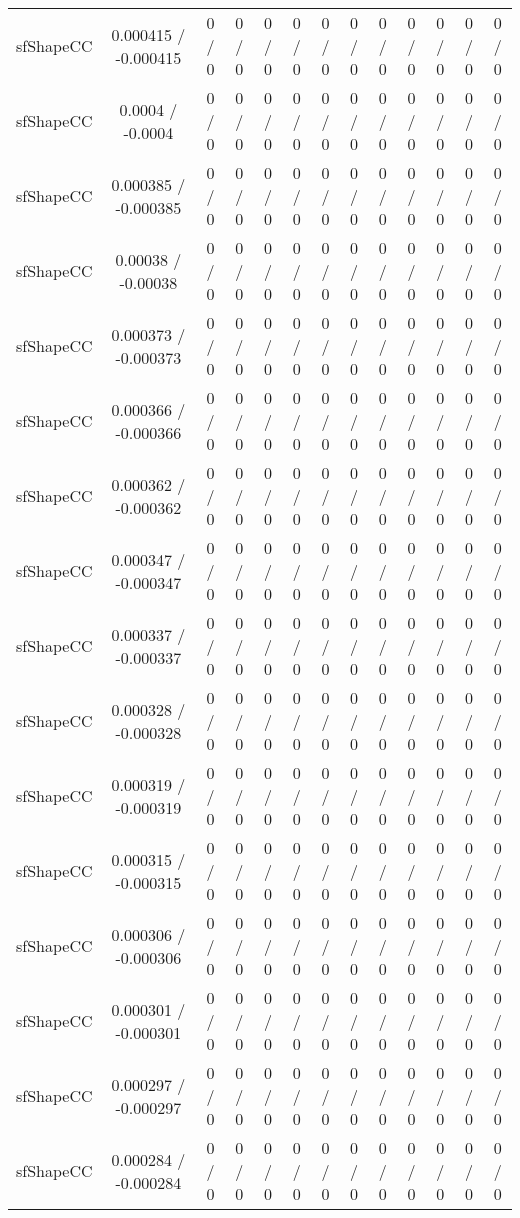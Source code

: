 \documentclass[10pt]{article}
\begin{document}
\begin{table}[htbp]
\begin{center}
\begin{tabular}{|c|c|c|c|c|c|c|c|c|c|c|c|c|}
  sfShapeCC & 0.000415 / -0.000415 & 0 / 0 & 0 / 0 & 0 / 0 & 0 / 0 & 0 / 0 & 0 / 0 & 0 / 0 & 0 / 0 & 0 / 0 & 0 / 0 & 0 / 0 \\ 
  sfShapeCC & 0.0004 / -0.0004 & 0 / 0 & 0 / 0 & 0 / 0 & 0 / 0 & 0 / 0 & 0 / 0 & 0 / 0 & 0 / 0 & 0 / 0 & 0 / 0 & 0 / 0 \\ 
  sfShapeCC & 0.000385 / -0.000385 & 0 / 0 & 0 / 0 & 0 / 0 & 0 / 0 & 0 / 0 & 0 / 0 & 0 / 0 & 0 / 0 & 0 / 0 & 0 / 0 & 0 / 0 \\ 
  sfShapeCC & 0.00038 / -0.00038 & 0 / 0 & 0 / 0 & 0 / 0 & 0 / 0 & 0 / 0 & 0 / 0 & 0 / 0 & 0 / 0 & 0 / 0 & 0 / 0 & 0 / 0 \\ 
  sfShapeCC & 0.000373 / -0.000373 & 0 / 0 & 0 / 0 & 0 / 0 & 0 / 0 & 0 / 0 & 0 / 0 & 0 / 0 & 0 / 0 & 0 / 0 & 0 / 0 & 0 / 0 \\ 
  sfShapeCC & 0.000366 / -0.000366 & 0 / 0 & 0 / 0 & 0 / 0 & 0 / 0 & 0 / 0 & 0 / 0 & 0 / 0 & 0 / 0 & 0 / 0 & 0 / 0 & 0 / 0 \\ 
  sfShapeCC & 0.000362 / -0.000362 & 0 / 0 & 0 / 0 & 0 / 0 & 0 / 0 & 0 / 0 & 0 / 0 & 0 / 0 & 0 / 0 & 0 / 0 & 0 / 0 & 0 / 0 \\ 
  sfShapeCC & 0.000347 / -0.000347 & 0 / 0 & 0 / 0 & 0 / 0 & 0 / 0 & 0 / 0 & 0 / 0 & 0 / 0 & 0 / 0 & 0 / 0 & 0 / 0 & 0 / 0 \\ 
  sfShapeCC & 0.000337 / -0.000337 & 0 / 0 & 0 / 0 & 0 / 0 & 0 / 0 & 0 / 0 & 0 / 0 & 0 / 0 & 0 / 0 & 0 / 0 & 0 / 0 & 0 / 0 \\ 
  sfShapeCC & 0.000328 / -0.000328 & 0 / 0 & 0 / 0 & 0 / 0 & 0 / 0 & 0 / 0 & 0 / 0 & 0 / 0 & 0 / 0 & 0 / 0 & 0 / 0 & 0 / 0 \\ 
  sfShapeCC & 0.000319 / -0.000319 & 0 / 0 & 0 / 0 & 0 / 0 & 0 / 0 & 0 / 0 & 0 / 0 & 0 / 0 & 0 / 0 & 0 / 0 & 0 / 0 & 0 / 0 \\ 
  sfShapeCC & 0.000315 / -0.000315 & 0 / 0 & 0 / 0 & 0 / 0 & 0 / 0 & 0 / 0 & 0 / 0 & 0 / 0 & 0 / 0 & 0 / 0 & 0 / 0 & 0 / 0 \\ 
  sfShapeCC & 0.000306 / -0.000306 & 0 / 0 & 0 / 0 & 0 / 0 & 0 / 0 & 0 / 0 & 0 / 0 & 0 / 0 & 0 / 0 & 0 / 0 & 0 / 0 & 0 / 0 \\ 
  sfShapeCC & 0.000301 / -0.000301 & 0 / 0 & 0 / 0 & 0 / 0 & 0 / 0 & 0 / 0 & 0 / 0 & 0 / 0 & 0 / 0 & 0 / 0 & 0 / 0 & 0 / 0 \\ 
  sfShapeCC & 0.000297 / -0.000297 & 0 / 0 & 0 / 0 & 0 / 0 & 0 / 0 & 0 / 0 & 0 / 0 & 0 / 0 & 0 / 0 & 0 / 0 & 0 / 0 & 0 / 0 \\ 
  sfShapeCC & 0.000284 / -0.000284 & 0 / 0 & 0 / 0 & 0 / 0 & 0 / 0 & 0 / 0 & 0 / 0 & 0 / 0 & 0 / 0 & 0 / 0 & 0 / 0 & 0 / 0 \\ 

\end{tabular}
\end{center}
\end{table}
\end{document}
